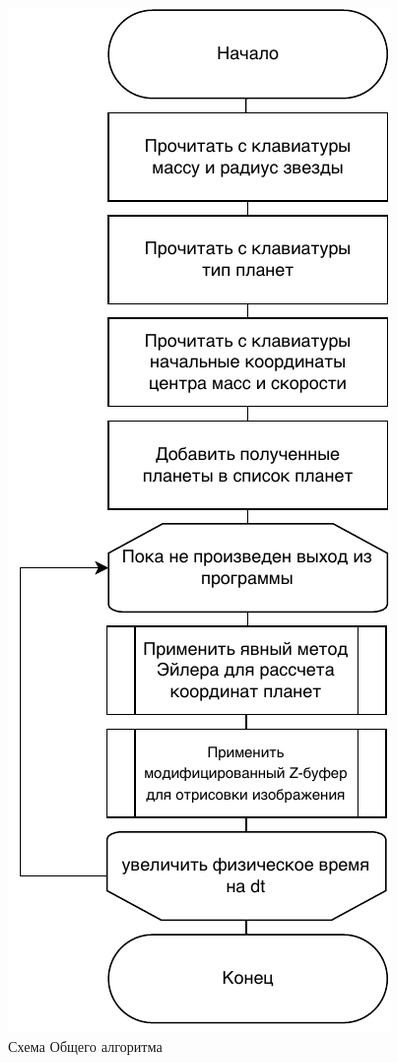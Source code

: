 \begin{figure}[h!]
            \includegraphics[scale=0.8]{inc/All_alg.pdf}
            \caption{Схема Общего алгоритма}
            \label{schema:All_alg}
        \end{figure}\clearpage
